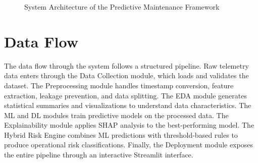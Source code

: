 \documentclass[12pt,letterpaper]{report}
\begin{document}
\begin{figure}[H]
\centering
{}
\caption{System Architecture of the Predictive Maintenance Framework}
\label{fig:architecture}
\end{figure}

\section{Data Flow}

The data flow through the system follows a structured pipeline. Raw telemetry data enters through the Data Collection module, which loads and validates the dataset. The Preprocessing module handles timestamp conversion, feature extraction, leakage prevention, and data splitting. The EDA module generates statistical summaries and visualizations to understand data characteristics. The ML and DL modules train predictive models on the processed data. The Explainability module applies SHAP analysis to the best-performing model. The Hybrid Risk Engine combines ML predictions with threshold-based rules to produce operational risk classifications. Finally, the Deployment module exposes the entire pipeline through an interactive Streamlit interface.
\end{document}
